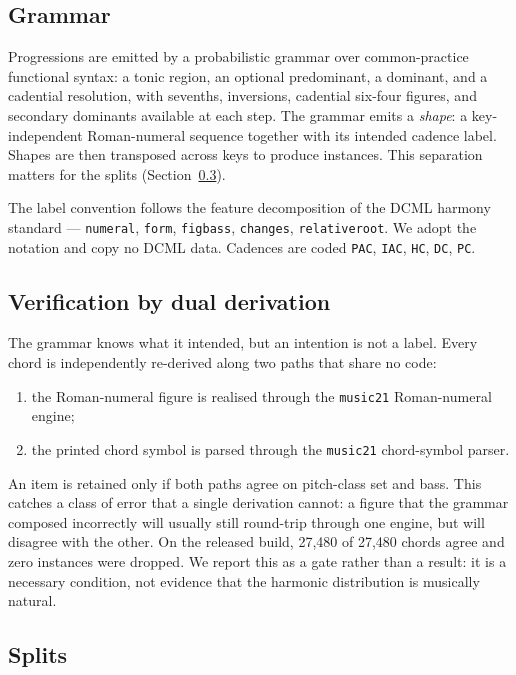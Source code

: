 \documentclass[11pt]{article}
\begin{document}
\subsection{Grammar}

Progressions are emitted by a probabilistic grammar over common-practice
functional syntax: a tonic region, an optional predominant, a dominant, and a
cadential resolution, with sevenths, inversions, cadential six-four figures, and
secondary dominants available at each step. The grammar emits a
\emph{shape}: a key-independent Roman-numeral sequence together with its intended
cadence label. Shapes are then transposed across keys to produce instances. This
separation matters for the splits (Section~\ref{sec:splits}).

The label convention follows the feature decomposition of the DCML harmony
standard \cite{dcml} --- \texttt{numeral}, \texttt{form}, \texttt{figbass},
\texttt{changes}, \texttt{relativeroot}. We adopt the notation and copy no DCML
data. Cadences are coded \texttt{PAC}, \texttt{IAC}, \texttt{HC}, \texttt{DC},
\texttt{PC}.

\subsection{Verification by dual derivation}

The grammar knows what it intended, but an intention is not a label. Every chord
is independently re-derived along two paths that share no code:

\begin{enumerate}
  \item the Roman-numeral figure is realised through the \texttt{music21}
    \cite{music21} Roman-numeral engine;
  \item the printed chord symbol is parsed through the \texttt{music21}
    chord-symbol parser.
\end{enumerate}

An item is retained only if both paths agree on pitch-class set and bass. This
catches a class of error that a single derivation cannot: a figure that the
grammar composed incorrectly will usually still round-trip through one engine,
but will disagree with the other. On the released build, 27{,}480 of 27{,}480
chords agree and zero instances were dropped. We report this as a gate rather
than a result: it is a necessary condition, not evidence that the harmonic
distribution is musically natural.

\subsection{Splits}
\label{sec:splits}
\end{document}
